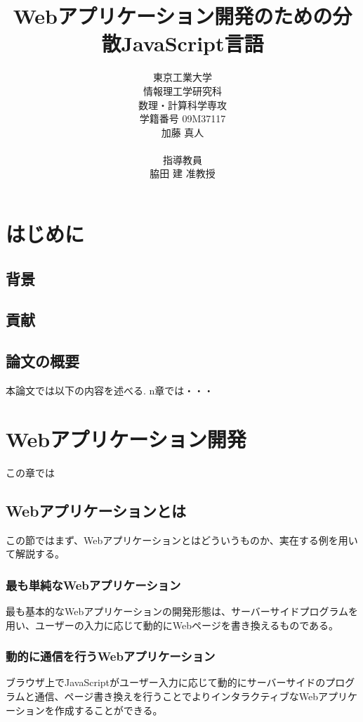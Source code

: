 \documentclass[a4j,12pt]{jreport}
\title {Webアプリケーション開発のための分散JavaScript言語}
\author{東京工業大学 \\情報理工学研究科 \\数理・計算科学専攻 \\学籍番号 09M37117\\加藤 真人\\\\指導教員\\脇田 建 准教授}
\begin{document}
\pagestyle {fancy}
\maketitle
\tableofcontents
\listoffigures

\pagestyle {fancy}

\chapter{はじめに}
\section{背景}
\section{貢献}

\section{論文の概要}
 本論文では以下の内容を述べる.
 n章では・・・

\chapter{Webアプリケーション開発}
この章では
\section{Webアプリケーションとは}
この節ではまず、Webアプリケーションとはどういうものか、実在する例を用いて解説する。

\subsection{最も単純なWebアプリケーション}
最も基本的なWebアプリケーションの開発形態は、サーバーサイドプログラムを用い、ユーザーの入力に応じて動的にWebページを書き換えるものである。

\subsection{動的に通信を行うWebアプリケーション}
ブラウザ上でJavaScriptがユーザー入力に応じて動的にサーバーサイドのプログラムと通信、ページ書き換えを行うことでよりインタラクティブなWebアプリケーションを作成することができる。
\end{document}
